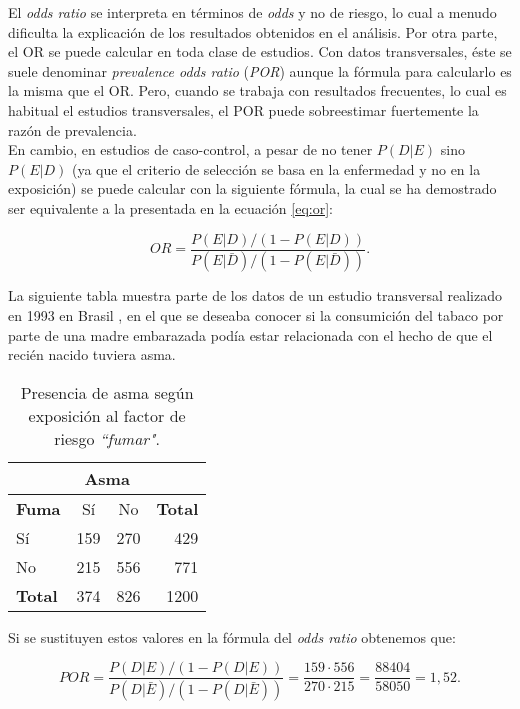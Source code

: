 El \textit{odds ratio} se interpreta en términos de \textit{odds} y no de riesgo, lo cual a menudo dificulta la explicación de los resultados obtenidos en el análisis. Por otra parte, el OR se puede calcular en toda clase de estudios. Con datos transversales, éste se suele denominar \textit{prevalence odds ratio} (\textit{POR}) aunque la fórmula para calcularlo es la misma que el OR. Pero, cuando se trabaja con resultados frecuentes, lo cual es habitual el estudios transversales, el POR puede sobreestimar fuertemente la razón de prevalencia.\\

En cambio, en estudios de caso-control, a pesar de no tener $P(D|E)$ sino $P(E|D)$ (ya que el criterio de selección se basa en la enfermedad y no en la exposición) se puede calcular con la siguiente fórmula, la cual se ha demostrado ser equivalente a la presentada en la ecuación \eqref{eq:or}:

\begin{equation*}
OR=\frac{P(E|D)/(1-P(E|D))}{P(E|\bar{D})/(1-P(E|\bar{D}))}.
\end{equation*}

La siguiente tabla muestra parte de los datos de un estudio transversal realizado en 1993 en Brasil \autocite{DatosEjemplo}, en el que se deseaba conocer si la consumición del tabaco por parte de una madre embarazada podía estar relacionada con el hecho de que el recién nacido tuviera asma.

\begin{table}[h!]
	\centering
	\label{tab:2}
	\begin{tabular}{l c c r}
		\toprule
		\multicolumn{4}{c}{\textbf{Asma}} \\
		\midrule
		\textbf{Fuma} & Sí & No & 	\textbf{Total} \\
		\midrule
		Sí & 159  & 270 &   429\\
		No &   215  & 556  & 771\\
		\textbf{Total} & 374 & 826 & 1200\\
		\bottomrule
	\end{tabular}
	\caption{Presencia de asma según exposición al factor de riesgo \textit{``fumar"}.}
\end{table}

Si se sustituyen estos valores en la fórmula del \textit{odds ratio} obtenemos que:

\begin{equation*}
POR=\frac{P(D|E)/(1-P(D|E))}{P(D|\bar{E})/(1-P(D|\bar{E}))}=\frac{159 \cdot 556}{270 \cdot 215}=\frac{88404}{58050}=1,52 .
\end{equation*}

